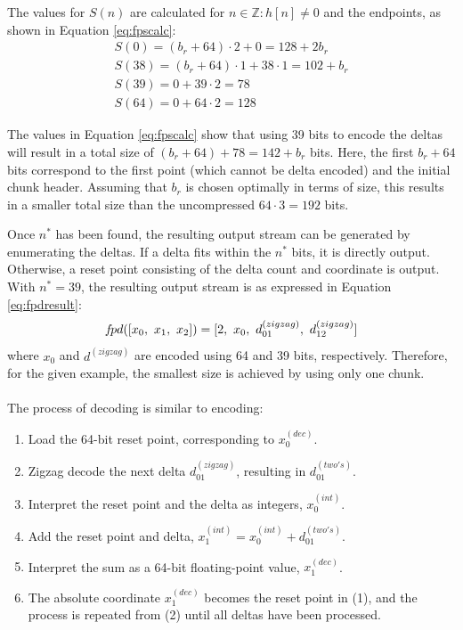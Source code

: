 The values for $S(n)$ are calculated for $n \in \mathbb{Z} : h[n] \neq 0 $ and the endpoints, as shown in Equation \ref{eq:fpscalc}:
\begin{equation}\label{eq:fpscalc}
  \begin{gathered}
    S(0) = (b_r + 64) \cdot 2 + 0 = 128 + 2b_r \\
    S(38) = (b_r + 64) \cdot 1 + 38 \cdot 1  = 102 + b_r \\
    S(39) = 0 + 39 \cdot 2= 78 \\
    S(64) = 0 + 64 \cdot 2 = 128
  \end{gathered}
\end{equation}

The values in Equation \ref{eq:fpscalc} show that using 39 bits to encode the deltas will result in a total size of $(b_r + 64) + 78 = 142 + b_r$ bits. Here, the first $b_r + 64$ bits correspond to the first point (which cannot be delta encoded) and the initial chunk header. Assuming that $b_r$ is chosen optimally in terms of size, this results in a smaller total size than the uncompressed $64 \cdot 3 = 192$ bits.

Once $n^*$ has been found, the resulting output stream can be generated by enumerating the deltas. If a delta fits within the $n^*$ bits, it is directly output. Otherwise, a reset point consisting of the delta count and coordinate is output. With $n^*=39$, the resulting output stream is as expressed in Equation \ref{eq:fpdresult}:
\begin{equation}
    f\hspace{-0.15em}pd([x_0,\ x_1,\ x_2]) = [2,\ x_0,\ d_{01}^{(zigzag)},\ d_{12}^{(zigzag)}]
    \label{eq:fpdresult}
\end{equation}
where $x_0$ and $d^{(zigzag)}$ are encoded using 64 and 39 bits, respectively. Therefore, for the given example, the smallest size is achieved by using only one chunk.
\\\\
The process of decoding is similar to encoding:
\begin{enumerate}
    \item Load the 64-bit reset point, corresponding to $x_0^{(dec)}$.
    \item Zigzag decode the next delta $d_{01}^{(zigzag)}$, resulting in $d_{01}^{(two's)}$.
    \item Interpret the reset point and the delta as integers, $x_0^{(int)}$.
    \item Add the reset point and delta, $x_1^{(int)} = x_0^{(int)} + d_{01}^{(two's)}$.
    \item Interpret the sum as a 64-bit floating-point value, $x_1^{(dec)}$.
    \item The absolute coordinate $x_1^{(dec)}$ becomes the reset point in (1), and the process is repeated from (2) until all deltas have been processed.
\end{enumerate}

